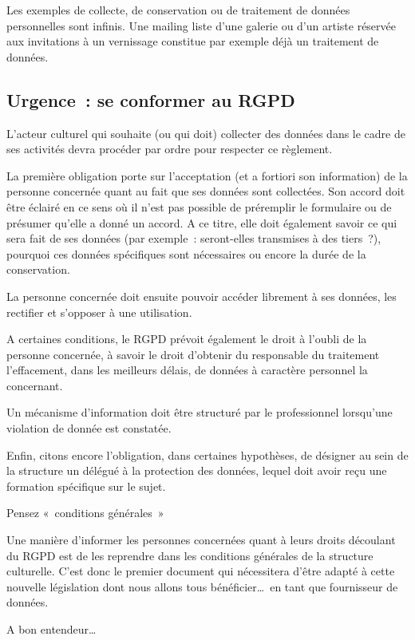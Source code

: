 \documentclass[11pt, french]{article}
\begin{document}
Les exemples de collecte, de conservation ou de traitement de données
personnelles sont infinis. Une mailing liste d'une galerie ou d'un
artiste réservée aux invitations à un vernissage constitue par exemple
déjà un traitement de données.

\subsection{Urgence~: se conformer au RGPD}

L'acteur culturel qui souhaite (ou qui doit) collecter des données
dans le cadre de ses activités devra procéder par ordre pour respecter
ce règlement.

La première obligation porte sur l'acceptation (et a fortiori son
information) de la personne concernée quant au fait que ses données
sont collectées. Son accord doit être éclairé en ce sens où il n'est
pas possible de préremplir le formulaire ou de présumer qu'elle a
donné un accord. A ce titre, elle doit également savoir ce qui sera
fait de ses données (par exemple~: seront-elles transmises à des
tiers~?), pourquoi ces données spécifiques sont nécessaires ou encore la
durée de la conservation.

La personne concernée doit ensuite pouvoir accéder librement à ses
données, les rectifier et s'opposer à une utilisation.

A certaines conditions, le RGPD prévoit également le droit à l'oubli
de la personne concernée, à savoir le droit d'obtenir du responsable
du traitement l'effacement, dans les meilleurs délais, de données à
caractère personnel la concernant.

Un mécanisme d'information doit être structuré par le professionnel
lorsqu'une violation de donnée est constatée.

Enfin, citons encore l'obligation, dans certaines hypothèses, de
désigner au sein de la structure un délégué à la protection des
données, lequel doit avoir reçu une formation spécifique sur le sujet.

Pensez «~conditions générales~»

Une manière d'informer les personnes concernées quant à leurs droits
découlant du RGPD est de les reprendre dans les conditions générales
de la structure culturelle. C'est donc le premier document qui
nécessitera d'être adapté à cette nouvelle législation dont nous
allons tous bénéficier\ldots\ en tant que fournisseur de données.

A bon entendeur\ldots
\end{document}
